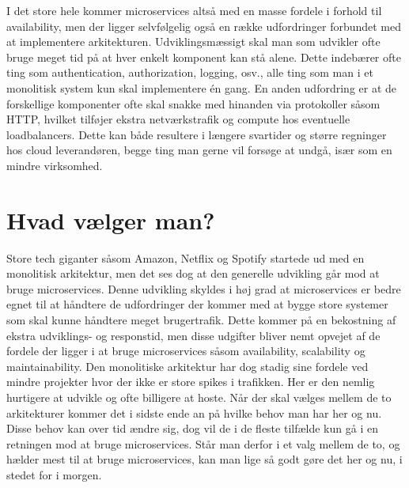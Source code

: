 \documentclass{article}
\begin{document}
\begin{flushleft}
I det store hele kommer microservices altså med en masse fordele i forhold til availability, men der ligger selvfølgelig også en række udfordringer forbundet med at implementere arkitekturen. Udviklingsmæssigt skal man som udvikler ofte bruge meget tid på at hver enkelt komponent kan stå alene. Dette indebærer ofte ting som authentication, authorization, logging, osv., alle ting som man i et monolitisk system kun skal implementere én gang.\cite{micro6} En anden udfordring er at de forskellige komponenter ofte skal snakke med hinanden via protokoller såsom HTTP, hvilket tilføjer ekstra netværkstrafik og compute hos eventuelle loadbalancers. Dette kan både resultere i længere svartider og større regninger hos cloud leverandøren, begge ting man gerne vil forsøge at undgå, især som en mindre virksomhed.\cite{micro7}

\section*{Hvad vælger man?}
Store tech giganter såsom Amazon, Netflix og Spotify startede ud med en monolitisk arkitektur, men det ses dog at den generelle udvikling går mod at bruge microservices.\cite{mono3} Denne udvikling skyldes i høj grad at microservices er bedre egnet til at håndtere de udfordringer der kommer med at bygge store systemer som skal kunne håndtere meget brugertrafik. Dette kommer på en bekostning af ekstra udviklings- og responstid, men disse udgifter bliver nemt opvejet af de fordele der ligger i at bruge microservices såsom availability, scalability og maintainability. Den monolitiske arkitektur har dog stadig sine fordele ved mindre projekter hvor der ikke er store spikes i trafikken. Her er den nemlig hurtigere at udvikle og ofte billigere at hoste. Når der skal vælges mellem de to arkitekturer kommer det i sidste ende an på hvilke behov man har her og nu. Disse behov kan over tid ændre sig, dog vil de i de fleste tilfælde kun gå i en retningen mod at bruge microservices. Står man derfor i et valg mellem de to, og hælder mest til at bruge microservices, kan man lige så godt gøre det her og nu, i stedet for i morgen.\linebreak



\end{flushleft}
\end{document}
